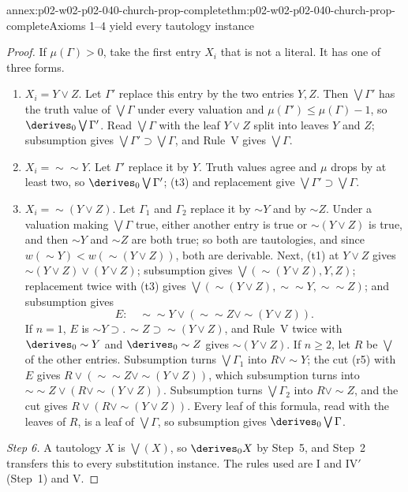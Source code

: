 \begin{annexitem}{annex:p02-w02-p02-040-church-prop-complete}{thm:p02-w02-p02-040-church-prop-complete}{Axioms 1--4 yield every tautology instance}
\begin{proof}
If \(\mu(\Gamma)>0\), take the first entry \(X_i\) that is not a literal.  It
has one of three forms.
\begin{enumerate}
 \item \(X_i=Y\vee Z\).  Let \(\Gamma'\) replace this entry by the two entries
   \(Y,Z\).  Then \(\bigvee\Gamma'\) has the truth value of \(\bigvee\Gamma\)
   under every valuation and \(\mu(\Gamma')\le\mu(\Gamma)-1\), so
   \(\derives_0\bigvee\Gamma'\).  Read \(\bigvee\Gamma\) with the leaf
   \(Y\vee Z\) split into leaves \(Y\) and \(Z\); subsumption gives
   \(\bigvee\Gamma'\supset\bigvee\Gamma\), and Rule~V gives \(\bigvee\Gamma\).
 \item \(X_i=\sim\sim Y\).  Let \(\Gamma'\) replace it by \(Y\).  Truth values
   agree and \(\mu\) drops by at least two, so \(\derives_0\bigvee\Gamma'\);
   (t3) and replacement give \(\bigvee\Gamma'\supset\bigvee\Gamma\).
 \item \(X_i=\sim(Y\vee Z)\).  Let \(\Gamma_1\) and \(\Gamma_2\) replace it by
   \(\sim Y\) and by \(\sim Z\).  Under a valuation making \(\bigvee\Gamma\)
   true, either another entry is true or \(\sim(Y\vee Z)\) is true, and then
   \(\sim Y\) and \(\sim Z\) are both true; so both are tautologies, and since
   \(w(\sim Y)<w(\sim(Y\vee Z))\), both are derivable.  Next, (t1) at
   \(Y\vee Z\) gives \(\sim(Y\vee Z)\vee(Y\vee Z)\); subsumption gives
   \(\bigvee(\sim(Y\vee Z),Y,Z)\); replacement twice with (t3) gives
   \(\bigvee(\sim(Y\vee Z),\sim\sim Y,\sim\sim Z)\); and subsumption gives
   \[
    E:\quad\sim\sim Y\vee(\sim\sim Z\vee\sim(Y\vee Z)).
   \]
   If \(n=1\), \(E\) is \(\sim Y\supset.\,\sim Z\supset\sim(Y\vee Z)\), and
   Rule~V twice with \(\derives_0\sim Y\) and \(\derives_0\sim Z\) gives
   \(\sim(Y\vee Z)\).  If \(n\ge2\), let \(R\) be \(\bigvee\) of the other entries.
   Subsumption turns \(\bigvee\Gamma_1\) into \(R\vee\sim Y\); the cut (r5)
   with \(E\) gives \(R\vee(\sim\sim Z\vee\sim(Y\vee Z))\), which subsumption
   turns into \(\sim\sim Z\vee(R\vee\sim(Y\vee Z))\).  Subsumption turns
   \(\bigvee\Gamma_2\) into \(R\vee\sim Z\), and the cut gives
   \(R\vee(R\vee\sim(Y\vee Z))\).  Every leaf of this formula, read with the
   leaves of \(R\), is a leaf of \(\bigvee\Gamma\), so subsumption gives
   \(\derives_0\bigvee\Gamma\).
\end{enumerate}

\emph{Step 6.}  A tautology \(X\) is \(\bigvee(X)\), so \(\derives_0X\) by
Step~5, and Step~2 transfers this to every substitution instance.  The rules
used are I and IV\('\) (Step~1) and V.
\end{proof}
\end{annexitem}

